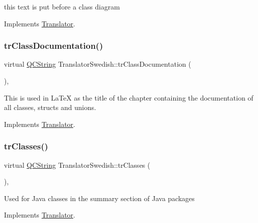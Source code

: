 this text is put before a class diagram 

Implements \mbox{\hyperlink{class_translator}{Translator}}.

\mbox{\label{class_translator_swedish_a6c8c3fee4fe5f57113295bbd4db35e39}} 
\subsubsection{\texorpdfstring{trClassDocumentation()}{trClassDocumentation()}}
{\footnotesize\ttfamily virtual \mbox{\hyperlink{class_q_c_string}{Q\+C\+String}} Translator\+Swedish\+::tr\+Class\+Documentation (\begin{DoxyParamCaption}{ }\end{DoxyParamCaption})\hspace{0.3cm}{\ttfamily [inline]}, {\ttfamily [virtual]}}

This is used in La\+TeX as the title of the chapter containing the documentation of all classes, structs and unions. 

Implements \mbox{\hyperlink{class_translator}{Translator}}.

\mbox{\label{class_translator_swedish_a3c9be9e6ecc458934bbc2a9b8e4366d9}} 
\subsubsection{\texorpdfstring{trClasses()}{trClasses()}}
{\footnotesize\ttfamily virtual \mbox{\hyperlink{class_q_c_string}{Q\+C\+String}} Translator\+Swedish\+::tr\+Classes (\begin{DoxyParamCaption}{ }\end{DoxyParamCaption})\hspace{0.3cm}{\ttfamily [inline]}, {\ttfamily [virtual]}}

Used for Java classes in the summary section of Java packages 

Implements \mbox{\hyperlink{class_translator}{Translator}}.

\mbox{\label{class_translator_swedish_a3601c515da16aa25970bfc4484090f9f}} 
